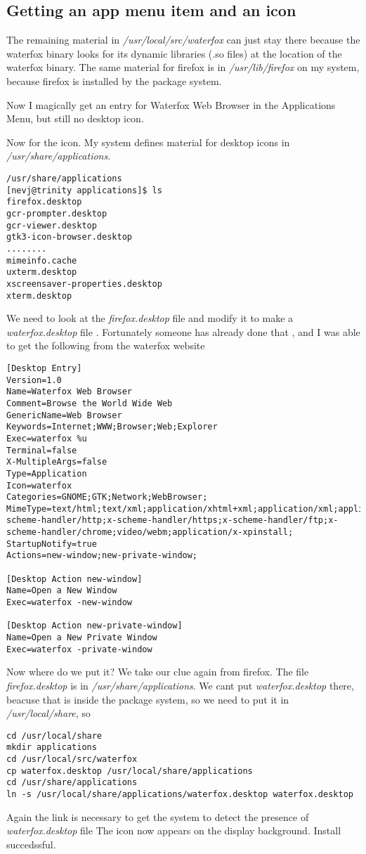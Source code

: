 \documentclass{article}  %
\begin{document}
\subsection{Getting an app menu item and an icon}
The remaining material in {\em /usr/local/src/waterfox} can just stay there because the waterfox binary looks for its dynamic libraries (.so files) at the location of the waterfox binary. The same material for firefox is in {\em /usr/lib/firefox} on my system,  because firefox is installed by the package system. 

Now I magically get an entry for Waterfox Web Browser in the Applications Menu, but still no desktop icon. 

Now for the icon. My system defines material for desktop icons in {\em /usr/share/applications}.
\begin{verbatim}
/usr/share/applications
[nevj@trinity applications]$ ls
firefox.desktop                     
gcr-prompter.desktop              
gcr-viewer.desktop               
gtk3-icon-browser.desktop       
........
mimeinfo.cache
uxterm.desktop
xscreensaver-properties.desktop
xterm.desktop
\end{verbatim}
 We need to look at the {\em firefox.desktop} file and modify it to make a {\em waterfox.desktop} file . Fortunately someone has already done that , and I was able to get the following from the waterfox website
\begin{verbatim}
[Desktop Entry]
Version=1.0
Name=Waterfox Web Browser
Comment=Browse the World Wide Web
GenericName=Web Browser
Keywords=Internet;WWW;Browser;Web;Explorer
Exec=waterfox %u
Terminal=false
X-MultipleArgs=false
Type=Application
Icon=waterfox
Categories=GNOME;GTK;Network;WebBrowser;
MimeType=text/html;text/xml;application/xhtml+xml;application/xml;application/rss+xml;application/rdf+xml;image/gif;image/jpeg;image/png;x-scheme-handler/http;x-scheme-handler/https;x-scheme-handler/ftp;x-scheme-handler/chrome;video/webm;application/x-xpinstall;
StartupNotify=true
Actions=new-window;new-private-window;

[Desktop Action new-window]
Name=Open a New Window
Exec=waterfox -new-window

[Desktop Action new-private-window]
Name=Open a New Private Window
Exec=waterfox -private-window
\end{verbatim}
 Now where do we put it?
We take our clue again from firefox. The file {\em firefox.desktop} is in {\em /usr/share/applications}. We cant put {\em waterfox.desktop} there, beacuse that is inside the package system, so we need to put it in {\em /usr/local/share}, so
\begin{verbatim}
cd /usr/local/share
mkdir applications
cd /usr/local/src/waterfox
cp waterfox.desktop /usr/local/share/applications
cd /usr/share/applications
ln -s /usr/local/share/applications/waterfox.desktop waterfox.desktop
\end{verbatim}
Again the link is necessary to get the system to detect the presence of {\em waterfox.desktop} file
The icon now appears on the display background. 
Install succedssful. 
\end{document}
